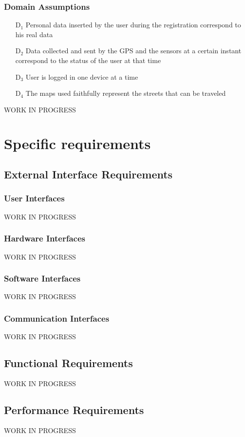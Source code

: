 \documentclass{report}
\newcommand{\subs}[1]{\ensuremath{_{\textrm{#1}}}}
\begin{document}
		\subsection{Domain Assumptions}
			 	\begin{itemize}
				 	\item[D\subs{1}]Personal data inserted by the user during the registration correspond to his real data
					\item[D\subs{2}]Data collected and sent by the GPS and the sensors at a certain instant correspond to the status of the user at that time
				
					\item[D\subs{3}]User is logged in one device at a time

					\item[D\subs{4}]The maps used faithfully represent the streets that can be traveled
					
				\end{itemize}
		WORK IN PROGRESS
	\chapter{Specific requirements}
		\section{External Interface Requirements}
			\subsection{User Interfaces}
			WORK IN PROGRESS
			\subsection{Hardware Interfaces}
			WORK IN PROGRESS
			\subsection{Software Interfaces}
			WORK IN PROGRESS
			\subsection{Communication Interfaces}
			WORK IN PROGRESS
		\section{Functional Requirements}
		WORK IN PROGRESS
		\section{Performance Requirements}
		WORK IN PROGRESS
\end{document}
